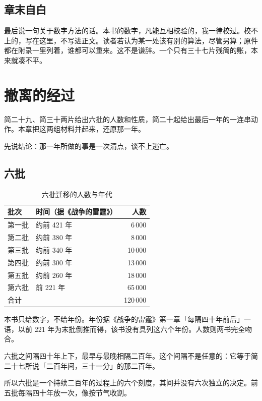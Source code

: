 \section{章末自白}

最后说一句关于数字方法的话。本书的数字，凡能互相校验的，我一律校过。校不上的，写在这里，不写进正文。读者若认为某一处该有别的算法，尽管另算；原件都在附录一里列着，谁都可以重来。这不是谦辞。一个只有三十七片残简的账，本来就凑不平。

\chapter{撤离的经过}

简二十九、简三十两片给出六批的人数和性质，简二十起给出最后一年的一连串动作。本章把这两组材料并起来，还原那一年。

先说结论：那一年所做的事是一次清点，谈不上逃亡。

\section{六批}

\begin{table}[htbp]
\centering
\small
\caption{六批迁移的人数与年代}
\label{tab:six}
\begin{tabular}{@{}llr@{}}
\toprule
批次 & 时间（据《战争的雷霆》） & 人数\\
\midrule
第一批 & 约前 421 年 & 6\,000\\
第二批 & 约前 380 年 & 8\,000\\
第三批 & 约前 340 年 & 10\,000\\
第四批 & 约前 300 年 & 13\,000\\
第五批 & 约前 260 年 & 18\,000\\
第六批 & 前 221 年 & 65\,000\\
\midrule
合计 & & 120\,000\\
\bottomrule
\end{tabular}
\end{table}

本书只给数字，不给年份。年份据《战争的雷霆》第一章「每隔四十年前后」一语，以前 221 年为末批倒推而得，该书没有具列这六个年份。人数则两书完全吻合。

六批之间隔四十年上下，最早与最晚相隔二百年。这个间隔不是任意的：它等于简二十七所说「二百年间，三十一分」的那二百年。

所以六批是一个持续二百年的过程上的六个刻度，其间并没有六次独立的决定。前五批每隔四十年放一次，像按节气收割。

